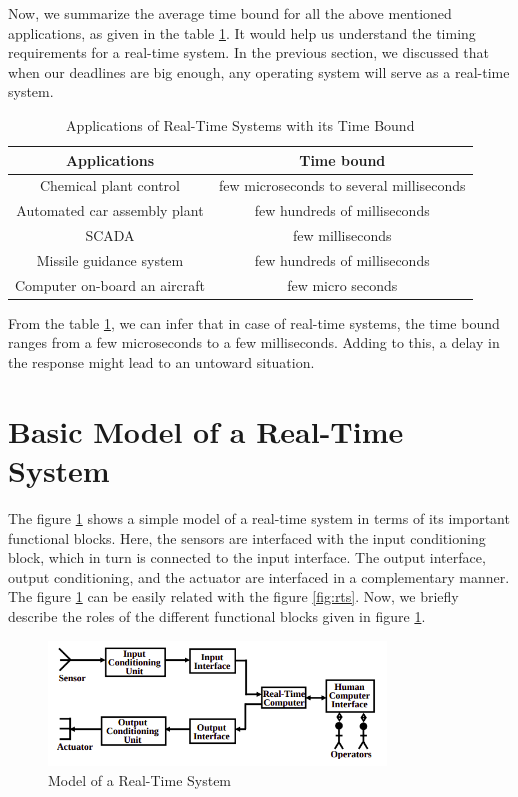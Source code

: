 \documentclass[12pt]{report}
\begin{document}
Now, we summarize the average time bound for all the above mentioned applications, as given in the table \ref{table:1}. It would help us understand the timing requirements for a real-time system. In the previous section, we discussed that when our deadlines are big enough, any operating system will serve as a real-time system. 
\begin{table}[h]
\centering
\begin{tabular}{|c|c|}
 \hline
 \textbf{Applications} & \textbf{Time bound} \\
 \hline \hline
 Chemical plant control & few microseconds to several milliseconds \\ 
 \hline
 Automated car assembly plant & few hundreds of milliseconds\\ 
 \hline
 SCADA & few milliseconds \\ 
 \hline
 Missile guidance system & few hundreds of milliseconds\\ 
 \hline
 Computer on-board an aircraft & few micro seconds \\
 \hline
\end{tabular}
\caption{Applications of Real-Time Systems with its Time Bound}
\label{table:1}
\end{table}

From the table \ref{table:1}, we can infer that in case of real-time systems, the time bound ranges from a few microseconds to a few milliseconds. Adding to this, a delay in the response might lead to an untoward situation.

\section{Basic Model of a Real-Time System}
The figure \ref{fig:model} shows a simple model of a real-time system in terms of its important functional blocks. Here, the sensors are interfaced with the input conditioning block, which in turn is connected to the input interface. The output interface, output conditioning, and the actuator are interfaced in a complementary manner. The figure \ref{fig:model} can be easily related with the figure \ref{fig:rts}.  Now, we
briefly describe the roles of the different functional blocks given in figure \ref{fig:model}. 
\begin{figure}[h]
    \centering
    \includegraphics[width=0.8\textwidth]{images/model-rts.png}
    \caption{Model of a Real-Time System}
    \label{fig:model}
\end{figure}
\end{document}
